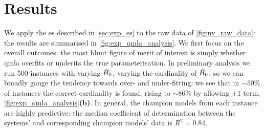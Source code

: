 \section{Results}

We apply the \gls{es} described in \cref{sec:exp_es} to the raw data of \cref{fig:nv_raw_data}:
    the results are summarised in \cref{fig:exp_qmla_analysis}.
We first focus on the overall outcomes:
    the most blunt figure of merit of interest is simply whether \gls{qmla}
    overfits or underits the true parameterisation. 
In preliminary analysis we run 500 \glspl{instance} with varying $\hat{H}_0$, 
    varying the cardinality of $\hat{H}_0$,
    so we can broadly gauge the tendency towards over- and under-fitting:
    we see that in $\sim50\%$ of \glspl{instance} the correct cardinality is found,  
    rising to $\sim86\%$ by allowing $\pm1$ term, \cref{fig:exp_qmla_analysis}\textbf{(b)}. 
In general, the \glspl{champion model} from each instance are highly predictive: 
    the median coefficient of determination between the systems' and corresponding \glspl{champion model}' data is 
    $R^2 = 0.84$. 
\par 

